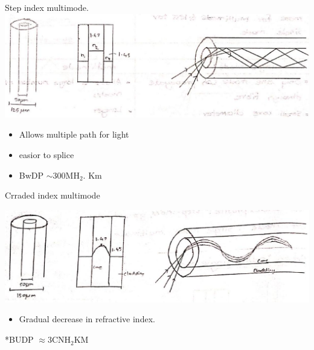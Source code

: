 \documentclass[10pt]{article}
\begin{document}
Step index multimode.\\
\includegraphics[max width=\textwidth, center]{2024_06_16_30d750483617f1939202g-05(4)}

\begin{itemize}
  \item Allows multiple path for light
  \item easior to splice
  \item BwDP $\sim 300 \mathrm{MH}_{2}$. Km
\end{itemize}

Crraded index multimode

\begin{center}
\includegraphics[max width=\textwidth]{2024_06_16_30d750483617f1939202g-06(3)}
\end{center}

\begin{itemize}
  \item Gradual decrease in refractive index.
\end{itemize}

*BUDP $\approx 3 \mathrm{CNH}_{2} \mathrm{KM}$
\end{document}
